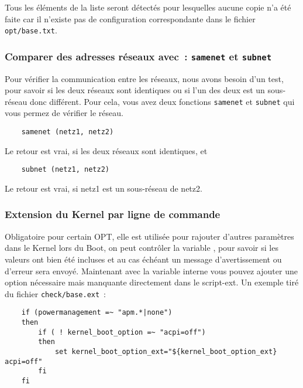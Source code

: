     Tous les éléments de la liste  seront détectés pour lesquelles aucune copie n'a été
	faite car il n'existe pas de configuration correspondante dans le fichier \texttt{opt/base.txt}.

\subsubsection{Comparer des adresses réseaux avec~: \texttt{samenet} et
  \texttt{subnet}}

Pour vérifier la communication entre les réseaux, nous avons besoin d'un test,
pour savoir si les deux réseaux sont identiques ou si l'un des deux est un
sous-réseau donc différent. Pour cela, vous avez deux fonctions \texttt{samenet} et
\texttt{subnet} qui vous permez de vérifier le réseau.

\begin{example}
\begin{verbatim}
    samenet (netz1, netz2)
\end{verbatim}
\end{example}

Le retour est \og{}vrai\fg{}, si les deux réseaux sont identiques, et

\begin{example}
\begin{verbatim}
    subnet (netz1, netz2)
\end{verbatim}
\end{example}

Le retour est \og{}vrai\fg{}, si \og{}netz1\fg{} est un sous-réseau de \og{}netz2\fg{}.


\subsubsection{Extension du Kernel par ligne de commande}

Obligatoire pour certain OPT, elle est utilisée pour rajouter d'autres paramètres
dans le Kernel lors du Boot, on peut contrôler la variable ,
pour savoir si les valeurs ont bien été incluses et au cas échéant un message d'avertissement
ou d'erreur sera envoyé. Maintenant avec la variable interne 
vous pouvez ajouter une option nécessaire mais manquante directement dans le script-ext.
Un exemple tiré du fichier \texttt{check/base.ext}~:

\begin{example}
\begin{verbatim}
    if (powermanagement =~ "apm.*|none")
    then
        if ( ! kernel_boot_option =~ "acpi=off")
        then
            set kernel_boot_option_ext="${kernel_boot_option_ext} acpi=off"
        fi
    fi
\end{verbatim}
\end{example}

